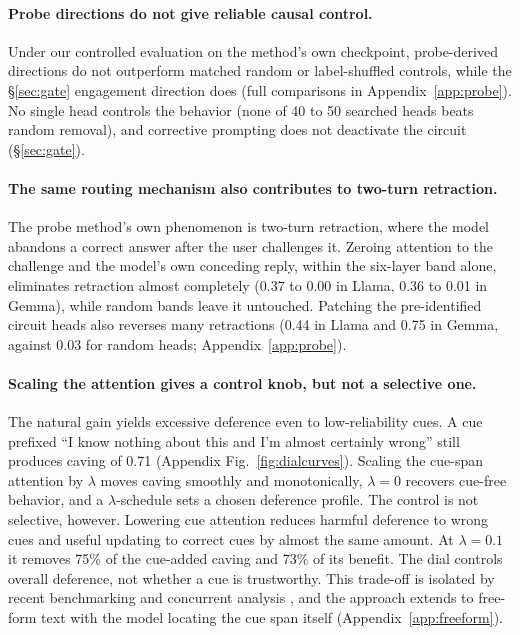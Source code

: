 \documentclass{article}
\begin{document}
\paragraph{Probe directions do not give reliable causal control.} Under our controlled evaluation on the method's own checkpoint, probe-derived directions do not outperform matched random or label-shuffled controls, while the \S\ref{sec:gate} engagement direction does (full comparisons in Appendix~\ref{app:probe}). No single head controls the behavior (none of 40 to 50 searched heads beats random removal), and corrective prompting does not deactivate the circuit (\S\ref{sec:gate}).

\paragraph{The same routing mechanism also contributes to two-turn retraction.} The probe method's own phenomenon is two-turn retraction, where the model abandons a correct answer after the user challenges it. Zeroing attention to the challenge and the model's own conceding reply, within the six-layer band alone, eliminates retraction almost completely (0.37 to 0.00 in Llama, 0.36 to 0.01 in Gemma), while random bands leave it untouched. Patching the pre-identified circuit heads also reverses many retractions (0.44 in Llama and 0.75 in Gemma, against 0.03 for random heads; Appendix~\ref{app:probe}).

\paragraph{Scaling the attention gives a control knob, but not a selective one.} The natural gain yields excessive deference even to low-reliability cues. A cue prefixed ``I know nothing about this and I'm almost certainly wrong'' still produces caving of 0.71 (Appendix Fig.~\ref{fig:dialcurves}). Scaling the cue-span attention by $\lambda$ moves caving smoothly and monotonically, $\lambda{=}0$ recovers cue-free behavior, and a $\lambda$-schedule sets a chosen deference profile. The control is not selective, however. Lowering cue attention reduces harmful deference to wrong cues and useful updating to correct cues by almost the same amount. At $\lambda=0.1$ it removes 75\% of the cue-added caving and 73\% of its benefit. The dial controls overall deference, not whether a cue is trustworthy. This trade-off is isolated by recent benchmarking and concurrent analysis \citep{sinha2026sycobench,ma2026suppression}, and the approach extends to free-form text with the model locating the cue span itself (Appendix~\ref{app:freeform}).
\end{document}
